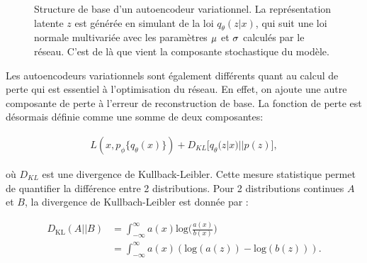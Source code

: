 \begin{figure}[h]
	\caption{Structure de base d'un autoencodeur variationnel. La représentation latente $z$ est générée en simulant de la loi $q_{\theta}(z|x)$,  qui suit une loi normale multivariée avec les paramètres $\boldmath \mu$ et $\boldmath \sigma$ calculés par le réseau. C'est de là que vient la composante stochastique du modèle.}
	\label{fig:VAEstructure}
\end{figure}

Les autoencodeurs variationnels sont également différents quant au calcul de perte qui est essentiel à l'optimisation du réseau. En effet, on ajoute une autre composante de perte à l'erreur de reconstruction de base. La fonction de perte est désormais définie comme une somme de deux composantes:

\begin{gather}  \label{eq:loss_vae}
L(x, p_\phi\{q_\theta(x)\}) + D_{KL}\big[q_\theta(z|x) || p(z)\big],
\end{gather}


où $D_{KL}$ est une divergence de Kullback-Leibler. Cette mesure statistique permet de quantifier la différence entre 2 distributions. Pour 2 distributions continues $A$ et $B$, la divergence de Kullbach-Leibler est donnée par :

\begin{equation}  \label{eq:kl}
	\begin{aligned}
		D_{\text{KL}}(A || B) &= \int_{-\infty}^{\infty} a(x) \text{log} \Big(\frac{a(x)}{b(x)}\Big)  \\
		 &= \int_{-\infty}^{\infty} a(x) (\text{log}(a(z)) - \text{log}(b(z))).
	\end{aligned}
\end{equation}

